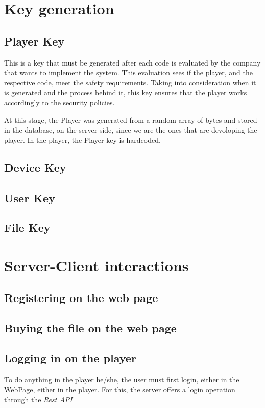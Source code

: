 \documentclass[11pt,a4paper]{report}
\begin{document}
\section{Key generation}
\subsection{Player Key}
This is a key that must be generated after each code is evaluated by the company that wants to implement the system. 
This evaluation sees if the player, and the respective code, meet the safety requirements. 
Taking into consideration when it is generated and the process behind it, this key ensures that the player works accordingly to the security policies.

\newline At this stage, the Player was generated from a random array of bytes and stored in the database, on the server side, since we are the ones that are devoloping the player.
In the player, the Player key is hardcoded.


\subsection{Device Key}
\subsection{User Key}
\subsection{File Key}

\section{Server-Client interactions}
\subsection{Registering on the web page}
\subsection{Buying the file on the web page}
\subsection{Logging in on the player}
To do anything in the player he/she, the user must first login, either in the WebPage, either in the player.
\newline For this, the server offers a login operation through the \emph{Rest API}
\end{document}
